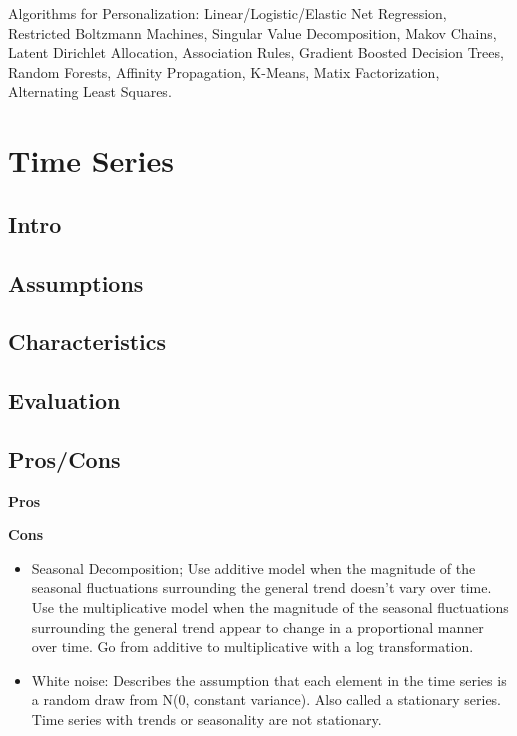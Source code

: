 \documentclass[]{book}
\theoremstyle{definition}
\theoremstyle{definition}
\theoremstyle{definition}
\theoremstyle{remark}
\begin{document}
Algorithms for Personalization: Linear/Logistic/Elastic Net Regression,
Restricted Boltzmann Machines, Singular Value Decomposition, Makov
Chains, Latent Dirichlet Allocation, Association Rules, Gradient Boosted
Decision Trees, Random Forests, Affinity Propagation, K-Means, Matix
Factorization, Alternating Least Squares.

\section{Time Series}\label{time-series}

\subsection{Intro}\label{intro-17}

\subsection{Assumptions}\label{assumptions-17}

\subsection{Characteristics}\label{characteristics-12}

\subsection{Evaluation}\label{evaluation-17}

\subsection{Pros/Cons}\label{proscons-17}

\textbf{Pros}

\textbf{Cons}

\begin{itemize}
\item
  Seasonal Decomposition; Use additive model when the magnitude of the
  seasonal fluctuations surrounding the general trend doesn't vary over
  time. Use the multiplicative model when the magnitude of the seasonal
  fluctuations surrounding the general trend appear to change in a
  proportional manner over time. Go from additive to multiplicative with
  a log transformation.
\item
  White noise: Describes the assumption that each element in the time
  series is a random draw from N(0, constant variance). Also called a
  stationary series. Time series with trends or seasonality are not
  stationary.
\end{itemize}
\end{document}
